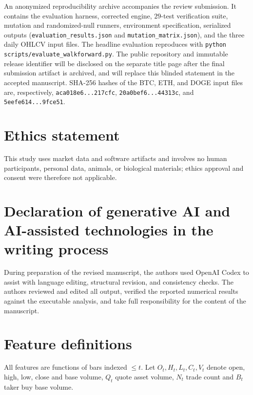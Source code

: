 \documentclass[preprint,12pt,authoryear]{elsarticle}
\begin{document}
An anonymized reproducibility archive accompanies the review submission. It
contains the evaluation harness, corrected engine, $29$-test verification suite,
mutation and randomized-null runners, environment specification, serialized
outputs (\texttt{evaluation\_results.json} and
\texttt{mutation\_matrix.json}), and the three daily OHLCV input files. The
headline evaluation reproduces with
\texttt{python scripts/evaluate\_walkforward.py}. The public repository and
immutable release identifier will be disclosed on the separate title page after
the final submission artifact is archived, and will replace this blinded
statement in the accepted manuscript. SHA-256 hashes of the BTC,
ETH, and DOGE input files are, respectively,
\texttt{aca018e6...217cfc}, \texttt{20a0bef6...44313c}, and
\texttt{5eefe614...9fce51}.

\section*{Ethics statement}

This study uses market data and software artifacts and involves no human
participants, personal data, animals, or biological materials; ethics approval
and consent were therefore not applicable.

\section*{Declaration of generative AI and AI-assisted technologies in the
writing process}

During preparation of the revised manuscript, the authors used OpenAI Codex to
assist with language editing, structural revision, and consistency checks. The
authors reviewed and edited all output, verified the reported numerical results
against the executable analysis, and take full responsibility for the content
of the manuscript.

\appendix

\section{Feature definitions}
\label{app:features}

All features are functions of bars indexed $\le t$. Let $O_t, H_t, L_t, C_t, V_t$
denote open, high, low, close and base volume, $Q_t$ quote asset volume, $N_t$
trade count and $B_t$ taker buy base volume.
\end{document}
